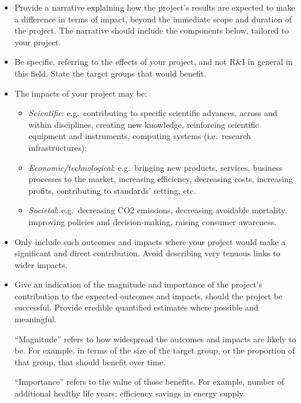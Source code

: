 \documentclass[12pt,draftproposal]{msca-pf}
\begin{document}
\begin{mscaexplanation}
\begin{itemize}
    \item Provide a narrative explaining how the project’s results are expected
    to make a difference in terms of impact, beyond the immediate scope and
    duration of the project. The narrative should include the components below,
    tailored to your project.

    \item Be specific, referring to the effects of your project, and not R\&I
    in general in this field. State the target groups that would benefit.

    \item The impacts of your project may be:

    \begin{itemize}
        \item \emph{Scientific}: e.g.\ contributing to specific scientific advances,
        across and within disciplines, creating new knowledge, reinforcing
        scientific equipment and instruments, computing systems (i.e.\ research
        infrastructures);

        \item \emph{Economic/technological}: e.g.\ bringing new
        products, services, business processes to the market, increasing efficiency,
        decreasing costs, increasing profits, contributing to standards’ setting,
        etc.

        \item \emph{Societal}: e.g.\ decreasing CO2 emissions,
        decreasing avoidable mortality, improving policies and decision-making,
        raising consumer awareness.
    \end{itemize}

    \item Only include such outcomes and impacts where your project would make
    a significant and direct contribution. Avoid describing very tenuous links
    to wider impacts.

    \item Give an indication of the magnitude and importance of the project's
    contribution to the expected outcomes and impacts, should the project be
    successful. Provide credible quantified estimates where possible and meaningful.

    ``Magnitude'' refers to how widespread the outcomes and impacts are likely
    to be. For example, in terms of the size of the target group, or the
    proportion of that group, that should benefit over time.

    ``Importance'' refers to the value of those benefits. For example, number of
    additional healthy life years; efficiency savings in energy supply.
\end{itemize}
\end{mscaexplanation}
\end{document}

